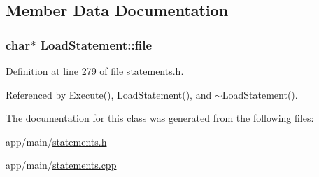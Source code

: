 \subsection{Member Data Documentation}
\subsubsection[{\texorpdfstring{file}{file}}]{\setlength{\rightskip}{0pt plus 5cm}char$\ast$ Load\+Statement\+::file\hspace{0.3cm}{\ttfamily [private]}}\hypertarget{classLoadStatement_acfe90dcc5509b0f26a52ef742362d46b}{}\label{classLoadStatement_acfe90dcc5509b0f26a52ef742362d46b}


Definition at line 279 of file statements.\+h.



Referenced by Execute(), Load\+Statement(), and $\sim$\+Load\+Statement().



The documentation for this class was generated from the following files\+:\begin{DoxyCompactItemize}
\item 
app/main/\hyperlink{statements_8h}{statements.\+h}\item 
app/main/\hyperlink{statements_8cpp}{statements.\+cpp}\end{DoxyCompactItemize}
